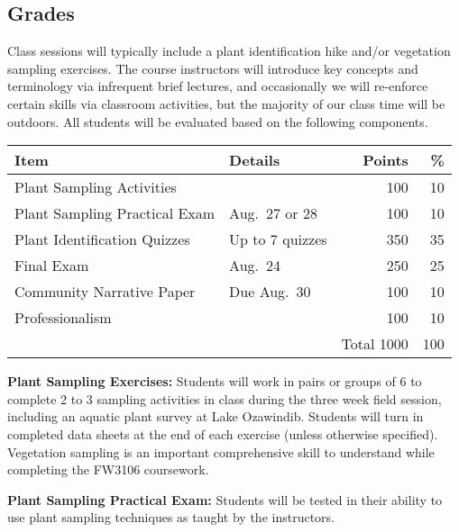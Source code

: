 \documentclass{tufte-handout}
\begin{document}
\begin{fullwidth}
\section{Grades}

Class sessions will typically include a plant identification hike and/or vegetation sampling exercises. The course instructors will introduce key concepts and terminology via infrequent brief lectures, and occasionally we will re-enforce certain skills via classroom activities, but the majority of our class time will be outdoors. All students will be evaluated based on the following components.


\begin{table}
\begin{tabular}{l l  r r}
Item & Details & Points & \% \\
\hline
Plant Sampling Activities &  & 100 & 10 \\
Plant Sampling Practical Exam & Aug.\ 27 or 28 & 100 & 10 \\
Plant Identification Quizzes & Up to 7 quizzes & 350 & 35 \\
Final Exam & Aug.\ 24 & 250  & 25 \\						%
Community Narrative Paper & Due Aug.\ 30 & 100 & 10 \\
Professionalism & & 100 & 10 \\
\hline
& & Total 1000 & 100
\end{tabular}
\end{table}

\end{fullwidth}

\textbf{Plant Sampling Exercises:} Students will work in pairs or groups of 6 to complete 2 to 3 sampling activities in class during the three week field session, including an aquatic plant survey at Lake Ozawindib. Students will turn in completed data sheets at the end of each exercise (unless otherwise specified). Vegetation sampling is an important comprehensive skill to understand while completing the FW3106 coursework. 


\textbf{Plant Sampling Practical Exam:} Students will be tested in their ability to use plant sampling techniques as taught by the instructors. 
\end{document}
